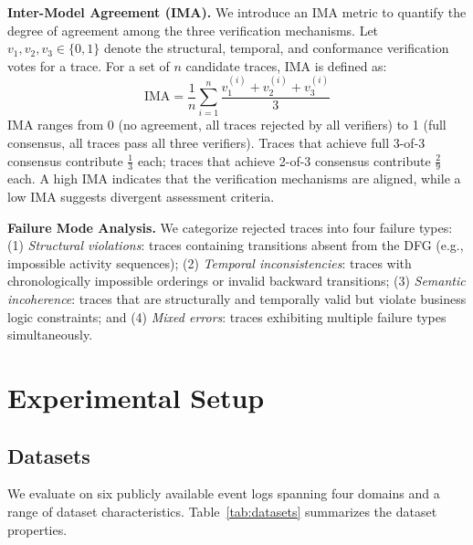 \documentclass[11pt,a4paper]{article}
\begin{document}
\textbf{Inter-Model Agreement (IMA).} We introduce an IMA metric to quantify the degree of agreement among the three verification mechanisms. Let $v_1, v_2, v_3 \in \{0, 1\}$ denote the structural, temporal, and conformance verification votes for a trace. For a set of $n$ candidate traces, IMA is defined as:
\begin{equation}
\text{IMA} = \frac{1}{n} \sum_{i=1}^{n} \frac{v_1^{(i)} + v_2^{(i)} + v_3^{(i)}}{3}
\end{equation}
IMA ranges from 0 (no agreement, all traces rejected by all verifiers) to 1 (full consensus, all traces pass all three verifiers). Traces that achieve full 3-of-3 consensus contribute $\frac{1}{3}$ each; traces that achieve 2-of-3 consensus contribute $\frac{2}{9}$ each. A high IMA indicates that the verification mechanisms are aligned, while a low IMA suggests divergent assessment criteria.

\textbf{Failure Mode Analysis.} We categorize rejected traces into four failure types: (1) \emph{Structural violations}: traces containing transitions absent from the DFG (e.g., impossible activity sequences); (2) \emph{Temporal inconsistencies}: traces with chronologically impossible orderings or invalid backward transitions; (3) \emph{Semantic incoherence}: traces that are structurally and temporally valid but violate business logic constraints; and (4) \emph{Mixed errors}: traces exhibiting multiple failure types simultaneously.


\section{Experimental Setup}

\subsection{Datasets}

We evaluate on six publicly available event logs spanning four domains and a range of dataset characteristics. Table~\ref{tab:datasets} summarizes the dataset properties.
\end{document}
